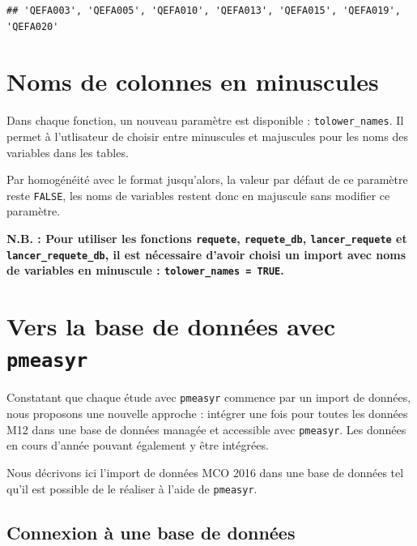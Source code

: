 \documentclass[
]{book}
\begin{document}
\begin{verbatim}
## 'QEFA003', 'QEFA005', 'QEFA010', 'QEFA013', 'QEFA015', 'QEFA019', 'QEFA020'
\end{verbatim}

\hypertarget{noms-de-colonnes-en-minuscules}{%
\chapter{Noms de colonnes en minuscules}\label{noms-de-colonnes-en-minuscules}}

Dans chaque fonction, un nouveau paramètre est disponible : \texttt{tolower\_names}. Il permet à l'utlisateur de choisir entre minuscules et majuscules pour les noms des variables dans les tables.

Par homogénéité avec le format jusqu'alors, la valeur par défaut de ce paramètre reste \texttt{FALSE}, les noms de variables restent donc en majuscule sans modifier ce paramètre.

\textbf{N.B. : Pour utiliser les fonctions \texttt{requete}, \texttt{requete\_db}, \texttt{lancer\_requete} et \texttt{lancer\_requete\_db}, il est nécessaire d'avoir choisi un import avec noms de variables en minuscule : \texttt{tolower\_names\ =\ TRUE}.}

\hypertarget{vers-la-base-de-donnuxe9es-avec-pmeasyr}{%
\chapter{\texorpdfstring{Vers la base de données avec \texttt{pmeasyr}}{Vers la base de données avec pmeasyr}}\label{vers-la-base-de-donnuxe9es-avec-pmeasyr}}

Constatant que chaque étude avec \texttt{pmeasyr} commence par un import de données, nous proposons une nouvelle approche : intégrer une fois pour toutes les données M12 dans une base de données managée et accessible avec \texttt{pmeasyr}. Les données en cours d'année pouvant également y être intégrées.

Nous décrivons ici l'import de données MCO 2016 dans une base de données tel qu'il est possible de le réaliser à l'aide de \texttt{pmeasyr}.

\hypertarget{connexion-uxe0-une-base-de-donnuxe9es}{%
\section{Connexion à une base de données}\label{connexion-uxe0-une-base-de-donnuxe9es}}
\end{document}
